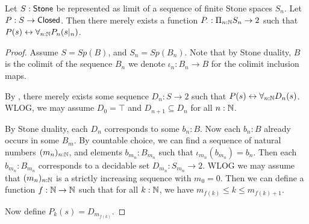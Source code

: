 \begin{lemma}
  Let $S:\mathsf{Stone}$ be represented as limit of a sequence of finite Stone spaces $S_n$. 
  Let $P:S \to \mathsf{Closed}$. 
  Then there merely exists a function $P_{\cdot} : \Pi_{n:\mathbb{N}} S_n \to 2$
  such that $P(s) \leftrightarrow \forall_{n:\mathbb{N}} P_n(s|_n)$. 
\end{lemma}  
\begin{proof}
  Assume $S=Sp(B)$, and $S_n = Sp(B_n)$. 
  Note that by Stone duality, $B$ is the colimit of the sequence $B_n$
  we denote $\iota_n:B_n\to B$ for the colimit inclusion maps.
  
  By , there merely exists some sequence $D_n:S\to 2$
  such that $P(s) \leftrightarrow \forall_{n:\mathbb{N}} D_n(s)$. 
  WLOG, we may assume $D_0 = \top$ and $D_{n+1}\subseteq D_n$ for all $n:\mathbb{N}$. 
  
  By Stone duality, each $D_n$ corresponds to some $b_n:B$. 
  Now each $b_n:B$ already occurs in some $B_{m}$.
  By countable choice, we can find a sequence of natural numbers $(m_n)_{n:\mathbb{N}}$, 
  and elements $b_{m_n}:B_{m_n}$ such that $\iota_{m_n}(b_{m_n}) = b_n$. 
  Then each $b_{m_n}:B_{m_n}$ corresponds to a decidable set 
  $D_{m_n}:S_{m_n} \to 2$. 
  WLOG we may assume that $(m_n)_{n:\mathbb{N}}$ is a strictly increasing sequence with $m_0 = 0$. 
  Then we can define a function $f:\mathbb{N} \to \mathbb{N}$ such that 
  for all $k:\mathbb{N}$, we have $m_{f(k)} \leq k \leq m_{f(k)+1}$. 

  Now define $P_k(s) = D_{m_{f(k)}}$.

  
\end{proof}
